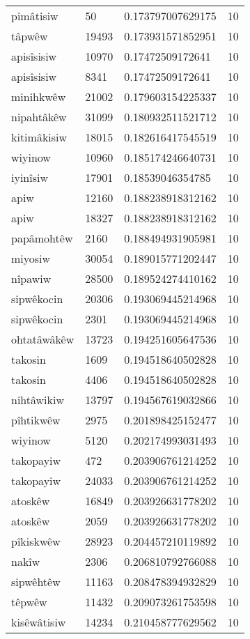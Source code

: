 \begin{longtable}{llll}
pimâtisiw & 50 & 0.173797007629175 & 10 \\
tâpwêw & 19493 & 0.173931571852951 & 10 \\
apisîsisiw & 10970 & 0.17472509172641 & 10 \\
apisîsisiw & 8341 & 0.17472509172641 & 10 \\
minihkwêw & 21002 & 0.179603154225337 & 10 \\
nipahtâkêw & 31099 & 0.180932511521712 & 10 \\
kitimâkisiw & 18015 & 0.182616417545519 & 10 \\
wiyinow & 10960 & 0.185174246640731 & 10 \\
iyinîsiw & 17901 & 0.18539046354785 & 10 \\
apiw & 12160 & 0.188238918312162 & 10 \\
apiw & 18327 & 0.188238918312162 & 10 \\
papâmohtêw & 2160 & 0.188494931905981 & 10 \\
miyosiw & 30054 & 0.189015771202447 & 10 \\
nîpawiw & 28500 & 0.189524274410162 & 10 \\
sipwêkocin & 20306 & 0.193069445214968 & 10 \\
sipwêkocin & 2301 & 0.193069445214968 & 10 \\
ohtatâwâkêw & 13723 & 0.194251605647536 & 10 \\
takosin & 1609 & 0.194518640502828 & 10 \\
takosin & 4406 & 0.194518640502828 & 10 \\
nihtâwikiw & 13797 & 0.194567619032866 & 10 \\
pîhtikwêw & 2975 & 0.201898425152477 & 10 \\
wiyinow & 5120 & 0.202174993031493 & 10 \\
takopayiw & 472 & 0.203906761214252 & 10 \\
takopayiw & 24033 & 0.203906761214252 & 10 \\
atoskêw & 16849 & 0.203926631778202 & 10 \\
atoskêw & 2059 & 0.203926631778202 & 10 \\
pîkiskwêw & 28923 & 0.204457210119892 & 10 \\
nakîw & 2306 & 0.206810792766088 & 10 \\
sipwêhtêw & 11163 & 0.208478394932829 & 10 \\
têpwêw & 11432 & 0.209073261753598 & 10 \\
kisêwâtisiw & 14234 & 0.210458777629562 & 10 \\

\end{longtable}
